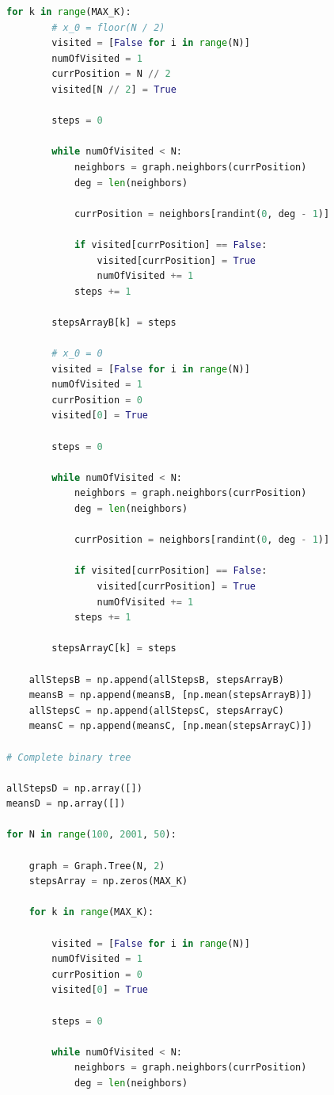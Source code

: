 \documentclass[12pt]{article}
\begin{document}
\begin{lstlisting}[language=Python, caption=random\_walk.py]
    for k in range(MAX_K):
        # x_0 = floor(N / 2)
        visited = [False for i in range(N)]
        numOfVisited = 1
        currPosition = N // 2
        visited[N // 2] = True

        steps = 0

        while numOfVisited < N:
            neighbors = graph.neighbors(currPosition)
            deg = len(neighbors)
            
            currPosition = neighbors[randint(0, deg - 1)]

            if visited[currPosition] == False:
                visited[currPosition] = True
                numOfVisited += 1
            steps += 1

        stepsArrayB[k] = steps

        # x_0 = 0
        visited = [False for i in range(N)]
        numOfVisited = 1
        currPosition = 0
        visited[0] = True

        steps = 0

        while numOfVisited < N:
            neighbors = graph.neighbors(currPosition)
            deg = len(neighbors)
            
            currPosition = neighbors[randint(0, deg - 1)]

            if visited[currPosition] == False:
                visited[currPosition] = True
                numOfVisited += 1
            steps += 1

        stepsArrayC[k] = steps

    allStepsB = np.append(allStepsB, stepsArrayB)
    meansB = np.append(meansB, [np.mean(stepsArrayB)])
    allStepsC = np.append(allStepsC, stepsArrayC)
    meansC = np.append(meansC, [np.mean(stepsArrayC)])

# Complete binary tree

allStepsD = np.array([])
meansD = np.array([])

for N in range(100, 2001, 50):

    graph = Graph.Tree(N, 2)
    stepsArray = np.zeros(MAX_K)

    for k in range(MAX_K):

        visited = [False for i in range(N)]
        numOfVisited = 1
        currPosition = 0
        visited[0] = True

        steps = 0

        while numOfVisited < N:
            neighbors = graph.neighbors(currPosition)
            deg = len(neighbors)
            

\end{lstlisting}
\end{document}
